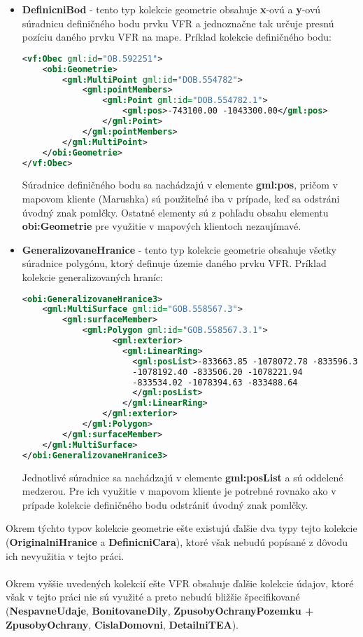 \begin{itemize}
    \item {\bf DefinicniBod} - tento typ kolekcie geometrie obsahuje {\bf x}-ovú a {\bf y}-ovú súradnicu definičného bodu prvku VFR a jednoznačne tak určuje presnú pozíciu daného prvku VFR na mape. Príklad kolekcie definičného bodu: 
    \begin{lstlisting}[language=XML]
<vf:Obec gml:id="OB.592251">
    <obi:Geometrie>
        <gml:MultiPoint gml:id="DOB.554782">
            <gml:pointMembers>
                <gml:Point gml:id="DOB.554782.1">
                    <gml:pos>-743100.00 -1043300.00</gml:pos>
                </gml:Point>
            </gml:pointMembers>
        </gml:MultiPoint>
    </obi:Geometrie>
</vf:Obec>
\end{lstlisting}
Súradnice definičného bodu sa nachádzajú v elemente {\bf gml:pos}, pričom v mapovom kliente (Marushka) sú použiteľné iba v prípade, keď sa odstráni úvodný znak pomlčky. Ostatné elementy sú z pohľadu obsahu elementu {\bf obi:Geometrie} pre využitie v mapových klientoch nezaujímavé.
\item{\bf GeneralizovaneHranice} - tento typ kolekcie geometrie obsahuje všetky súradnice polygónu, ktorý definuje územie daného prvku VFR. Príklad kolekcie generalizovaných hraníc:
\begin{lstlisting}[language=XML]
<obi:GeneralizovaneHranice3>
    <gml:MultiSurface gml:id="GOB.558567.3">
        <gml:surfaceMember>
            <gml:Polygon gml:id="GOB.558567.3.1">
                  <gml:exterior>
                    <gml:LinearRing>
                      <gml:posList>-833663.85 -1078072.78 -833596.36 
                      -1078192.40 -833506.20 -1078221.94 
                      -833534.02 -1078394.63 -833488.64 
                      </gml:posList>
                    </gml:LinearRing>
                </gml:exterior>
            </gml:Polygon>
        </gml:surfaceMember>
    </gml:MultiSurface>
</obi:GeneralizovaneHranice3>
\end{lstlisting}
Jednotlivé súradnice sa nachádzajú v elemente {\bf gml:posList} a sú oddelené medzerou. Pre ich využitie v mapovom kliente je potrebné rovnako ako v prípade kolekcie definičného bodu odstrániť úvodný znak pomlčky.
\end{itemize}
Okrem týchto typov kolekcie geometrie ešte existujú ďalšie dva typy tejto kolekcie ({\bf OriginalniHranice} a {\bf DefinicniCara}), ktoré však nebudú popísané z dôvodu ich nevyužitia v tejto práci. \\\\
Okrem vyššie uvedených kolekcií ešte VFR obsahuje ďalšie kolekcie údajov, ktoré však v tejto práci nie sú využité a preto nebudú bližšie špecifikované ({\bf NespavneUdaje}, {\bf BonitovaneDily}, {\bf ZpusobyOchranyPozemku + ZpusobyOchrany}, {\bf CislaDomovni}, {\bf DetailniTEA}).



